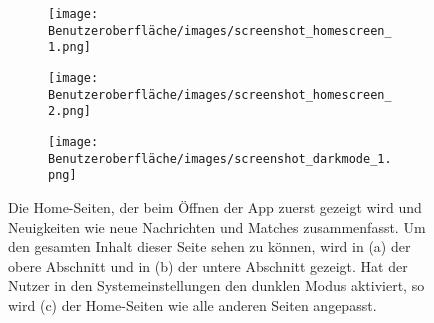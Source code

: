 \begin{figure}[H]
	\begin{subfigure}{0.33\textwidth}
	\centering
	\texttt{[image: Benutzeroberfläche/images/screenshot\_homescreen\_1.png]}
	\caption{}
	\label{fig:homescreen_a}
	\end{subfigure}
	\begin{subfigure}{0.33\textwidth}
	\centering
	\texttt{[image: Benutzeroberfläche/images/screenshot\_homescreen\_2.png]}
	\caption{}
	\label{fig:homescreen_b}
	\end{subfigure}
	\begin{subfigure}{0.33\textwidth}
	\centering
	\texttt{[image: Benutzeroberfläche/images/screenshot\_darkmode\_1.png]}
	\caption{}
	\label{fig:homescreen_c}
	\end{subfigure}
\caption[Screenshots des Home-Seiten]{Die Home-Seiten, der beim Öffnen der App zuerst gezeigt wird und Neuigkeiten wie neue Nachrichten und Matches zusammenfasst. Um den gesamten Inhalt dieser Seite sehen zu können, wird in (a) der obere Abschnitt und in (b) der untere Abschnitt gezeigt. Hat der Nutzer in den Systemeinstellungen den dunklen Modus aktiviert, so wird (c) der Home-Seiten wie alle anderen Seiten angepasst.}
\label{fig:homescreen_alle}
\end{figure}

